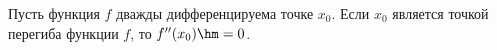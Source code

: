 
Пусть функция $f$ дважды дифференцируема точке $x_0$. Если $x_0$ является точкой перегиба функции $f$, то $f''(x_0)\hm=0$.
